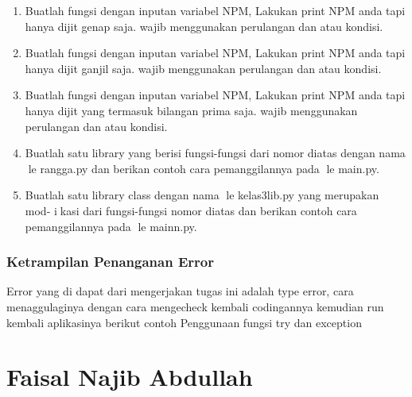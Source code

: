 \begin{enumerate}
    \item Buatlah fungsi dengan inputan variabel NPM, Lakukan print NPM anda tapi
    hanya dijit genap saja. wajib menggunakan perulangan dan atau kondisi.
    

    \item Buatlah fungsi dengan inputan variabel NPM, Lakukan print NPM anda tapi
    hanya dijit ganjil saja. wajib menggunakan perulangan dan atau kondisi.
    

    \item Buatlah fungsi dengan inputan variabel NPM, Lakukan print NPM anda tapi
    hanya dijit yang termasuk bilangan prima saja. wajib menggunakan perulangan
    dan atau kondisi.
    

    \item Buatlah satu library yang berisi fungsi-fungsi dari nomor diatas dengan nama
    le rangga.py dan berikan contoh cara pemanggilannya pada le main.py.
    

    \item Buatlah satu library class dengan nama le kelas3lib.py yang merupakan mod-
    ikasi dari fungsi-fungsi nomor diatas dan berikan contoh cara pemanggilannya
    pada le mainn.py.
    
    
\end{enumerate}
\subsubsection{Ketrampilan Penanganan Error}
Error yang di dapat dari mengerjakan tugas ini adalah type error, cara menaggulaginya dengan cara mengecheck kembali codingannya
kemudian run kembali aplikasinya
berikut contoh Penggunaan fungsi try dan exception



\section{Faisal Najib Abdullah}
